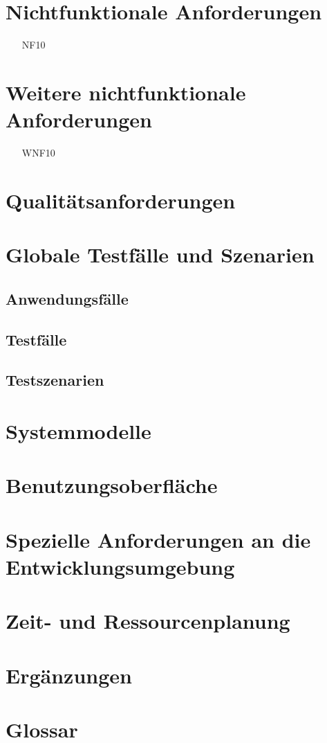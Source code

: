 \documentclass[parskip=full]{scrartcl}
\begin{document}
\section{Nichtfunktionale Anforderungen}
\begin{itemize}[nosep]
\item[NF10] %
\end{itemize}

\section{Weitere nichtfunktionale Anforderungen}
\begin{itemize}
\item[WNF10] %
\end{itemize}

\section{Qualitätsanforderungen}

\section{Globale Testfälle und Szenarien}
\subsection{Anwendungsfälle}
\subsection{Testfälle}
\subsection{Testszenarien}

\section{Systemmodelle}

\section{Benutzungsoberfläche}

\section{Spezielle Anforderungen an die Entwicklungsumgebung}

\section{Zeit- und Ressourcenplanung}

\section{Ergänzungen}

\section{Glossar}
\end{document}
